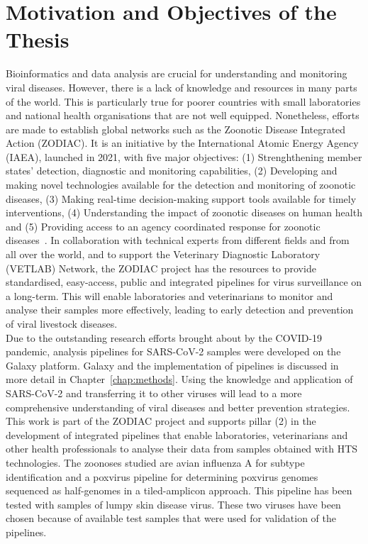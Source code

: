 \section{Motivation and Objectives of the Thesis}
Bioinformatics and data analysis are crucial for understanding and monitoring viral diseases. However, there is a lack of knowledge and resources in many parts of the world. This is particularly true for poorer countries with small laboratories and national health organisations that are not well equipped. Nonetheless, efforts are made to establish global networks such as the Zoonotic Disease Integrated Action (ZODIAC). It is an initiative by the International Atomic Energy Agency (IAEA), launched in 2021, with five major objectives: (1) Strenghthening member states' detection, diagnostic and monitoring capabilities, (2) Developing and making novel technologies available for the detection and monitoring of zoonotic diseases, (3) Making real-time decision-making support tools available for timely interventions, (4) Understanding the impact of zoonotic diseases on human health and (5) Providing access to an agency coordinated response for zoonotic diseases~\cite{zodiac2021}. In collaboration with technical experts from different fields and from all over the world, and to support the Veterinary Diagnostic Laboratory (VETLAB) Network, the ZODIAC project has the resources to provide standardised, easy-access, public and integrated pipelines for virus surveillance on a long-term. This will enable laboratories and veterinarians to monitor and analyse their samples more effectively, leading to early detection and prevention of viral livestock diseases.\\
Due to the outstanding research efforts brought about by the COVID-19 pandemic, analysis pipelines for SARS-CoV-2 samples were developed on the Galaxy platform. Galaxy and the implementation of pipelines is discussed in more detail in Chapter~\ref{chap:methods}. Using the knowledge and application of SARS-CoV-2 and transferring it to other viruses will lead to a more comprehensive understanding of viral diseases and better prevention strategies.\\
This work is part of the ZODIAC project and supports pillar (2) in the development of integrated pipelines that enable laboratories, veterinarians and other health professionals to analyse their data from samples obtained with HTS technologies. The zoonoses studied are avian influenza A for subtype identification and a poxvirus pipeline for determining poxvirus genomes sequenced as half-genomes in a tiled-amplicon approach. This pipeline has been tested with samples of lumpy skin disease virus. These two viruses have been chosen because of available test samples that were used for validation of the pipelines. \\
